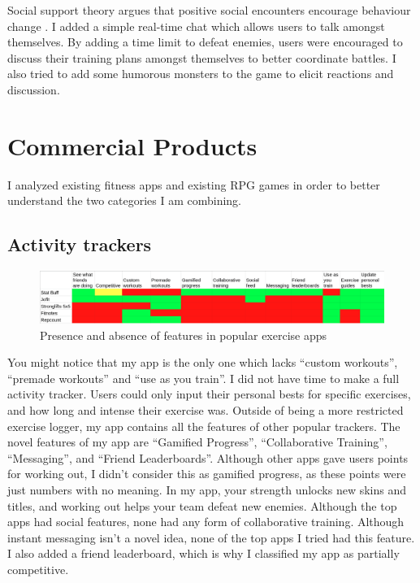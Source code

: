 \documentclass{l4proj}
\begin{document}
Social support theory argues that positive social encounters encourage behaviour change \citep{social_support_theory}. I added a simple real-time chat which allows users to talk amongst themselves. By adding a time limit to defeat enemies, users were encouraged to discuss their training plans amongst themselves to better coordinate battles. I also tried to add some humorous monsters to the game to elicit reactions and discussion. 


\section{Commercial Products}
I analyzed existing fitness apps and existing RPG games in order to better understand the two categories I am combining. 

\subsection{Activity trackers}
\begin{figure}[H]
    \centering
    \includegraphics[width=1.0\linewidth]{exercise_comparisons.png}    
    \caption{Presence and absence of features in popular exercise apps}
    \label{fig:exercises} 
\end{figure}
You might notice that my app is the only one which lacks ``custom workouts'', ``premade workouts'' and ``use as you train''. I did not have time to make a full activity tracker. Users could only input their personal bests for specific exercises, and how long and intense their exercise was.
Outside of being a more restricted exercise logger, my app contains all the features of other popular trackers. The novel features of my app are ``Gamified Progress'', ``Collaborative Training'', ``Messaging'', and ``Friend Leaderboards''. Although other apps gave users points for working out, I didn't consider this as gamified progress, as these points were just numbers with no meaning. In my app, your strength unlocks new skins and titles, and working out helps your team defeat new enemies. Although the top apps had social features, none had any form of collaborative training. Although instant messaging isn't a novel idea, none of the top apps I tried had this feature. I also added a friend leaderboard, which is why I classified my app as partially competitive.
\end{document}
